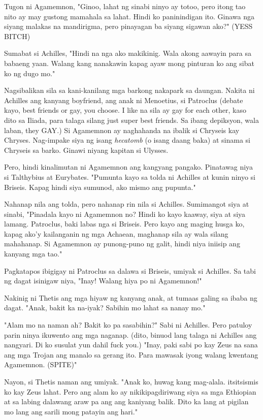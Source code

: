 \documentclass[12pt,letterpaper]{report}
\begin{document}
Tugon ni Agamemnon, "Ginoo, lahat ng sinabi ninyo ay totoo, pero itong tao nito ay may gustong mamahala sa lahat.
Hindi ko paninindigan ito. Ginawa nga siyang malakas na mandirigma, pero pinayagan ba siyang sigawan ako?" (YESS BITCH)

Sumabat si Achilles, "Hindi na nga ako makikinig. Wala akong aawayin para sa babaeng yaan.
Walang kang nanakawin kapag ayaw mong pinturan ko ang sibat ko ng dugo mo."

Nagsibalikan sila sa kani-kanilang mga barkong nakapark sa daungan. Nakita ni Achilles ang kanyang boyfriend,
ang anak ni Menoetius, si Patroclus (debate kayo, best friends or gay, you choose. I like na sila ay gay for each other,
kaso dito sa Iliada, para talaga silang just super best friends. Sa ibang depiksyon, wala laban, they GAY.)
Si Agamemnon ay naghahanda na ibalik si Chryseis kay Chryses.
Nag-impake siya ng isang \textit{hecatomb} (o isang daang baka) at sinama si Chryseis sa barko. Ginawi niyang kapitan si Ulysses.

Pero, hindi kinalimutan ni Agamemnon ang kangyang pangako. Pinatawag niya si Talthybius at Eurybates.
"Pumunta kayo sa tolda ni Achilles at kunin ninyo si Briseis. Kapag hindi siya sumunod, ako mismo ang pupunta."

Nahanap nila ang tolda, pero nahanap rin nila si Achilles. Sumimangot siya at sinabi, "Pinadala kayo ni Agamemnon no?
Hindi ko kayo kaaway, siya at siya lamang. Patroclus, baki labas nga si Briseis. Pero kayo ang maging husga ko,
kapag ako'y kailanganin ng mga Achaean, maghanap sila ay wala silang mahahanap. Si Agamemnon ay punong-puno ng galit,
hindi niya iniisip ang kanyang mga tao."

Pagkatapos ibigigay ni Patroclus sa dalawa si Briseis, umiyak si Achilles. Sa tabi ng dagat isinigaw niya, "Inay!
Walang hiya po ni Agamemnon!"

Nakinig ni Thetis ang mga hiyaw ng kanyang anak, at tumaas galing sa ibaba ng dagat. "Anak, bakit ka na-iyak?
Sabihin mo lahat sa nanay mo."

"Alam mo na naman ah? Bakit ko pa sasabihin?" Sabi ni Achilles. Pero patuloy parin ninya ikuwento ang mga naganap.
(dito, binuod lang talaga ni Achilles ang nangyari. Di ko susulat yun dahil fuck you.)
"Inay, paki sabi po kay Zeus na sana ang mga Trojan ang manalo sa gerang ito.
Para mawasak iyong walang kwentang Agamemnon. (SPITE)"

Nayon, si Thetis naman ang umiyak. "Anak ko, huwag kang mag-alala. itsitsismis ko kay Zeus lahat.
Pero ang alam ko ay nikikipagdiriwang siya sa mga Ethiopian at sa labing dalawang araw pa ang ang kaniyang balik.
Dito ka lang at pigilan mo lang ang sarili mong patayin ang hari."
\end{document}
